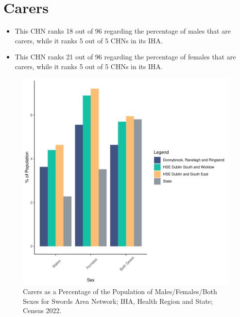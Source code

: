 \documentclass{article}
\begin{document}
\section{Carers}\label{sect:Carers}
\begin{itemize}
\item This CHN ranks  18 out of 96 regarding the percentage of males that are carers, while it ranks   5 out of 5 CHNs in its IHA.
\item This CHN ranks  21 out of 96 regarding the percentage of females that are carers, while it ranks   5 out of 5 CHNs in its IHA.
\end{itemize}
\begin{figure}[H]
	\centering
	\includegraphics[width = 150mm]{../figures/CareED.pdf}
	\caption{Carers as a Percentage of the Population of Males/Females/Both Sexes for Swords Area Network; IHA, Health Region and State; Census 2022.}
	\label{fig:2ae19629-1a6a-13a3-e055-000000000001}
	\end{figure}
\end{document}
